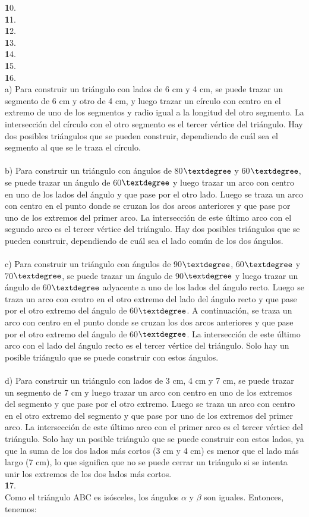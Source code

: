 \documentclass{article}
\begin{document}
{\textbf 10. }\\
{\textbf 11. }\\
{\textbf 12. }\\
{\textbf 13. }\\
{\textbf 14. }\\
{\textbf 15. }\\
{\textbf 16. }\\
a) Para construir un triángulo con lados de 6 cm y 4 cm, se puede trazar un segmento de 6 cm y otro de 4 cm, y luego trazar un círculo con centro en el extremo de uno de los segmentos y radio igual a la longitud del otro segmento. La intersección del círculo con el otro segmento es el tercer vértice del triángulo. Hay dos posibles triángulos que se pueden construir, dependiendo de cuál sea el segmento al que se le traza el círculo.\\
\\
b) Para construir un triángulo con ángulos de 80$\textdegree$ y 60$\textdegree$, se puede trazar un ángulo de 60$\textdegree$ y luego trazar un arco con centro en uno de los lados del ángulo y que pase por el otro lado. Luego se traza un arco con centro en el punto donde se cruzan los dos arcos anteriores y que pase por uno de los extremos del primer arco. La intersección de este último arco con el segundo arco es el tercer vértice del triángulo. Hay dos posibles triángulos que se pueden construir, dependiendo de cuál sea el lado común de los dos ángulos.\\
\\
c) Para construir un triángulo con ángulos de 90$\textdegree$, 60$\textdegree$ y 70$\textdegree$, se puede trazar un ángulo de 90$\textdegree$ y luego trazar un ángulo de 60$\textdegree$ adyacente a uno de los lados del ángulo recto. Luego se traza un arco con centro en el otro extremo del lado del ángulo recto y que pase por el otro extremo del ángulo de 60$\textdegree$. A continuación, se traza un arco con centro en el punto donde se cruzan los dos arcos anteriores y que pase por el otro extremo del ángulo de 60$\textdegree$. La intersección de este último arco con el lado del ángulo recto es el tercer vértice del triángulo. Solo hay un posible triángulo que se puede construir con estos ángulos.\\
\\
d) Para construir un triángulo con lados de 3 cm, 4 cm y 7 cm, se puede trazar un segmento de 7 cm y luego trazar un arco con centro en uno de los extremos del segmento y que pase por el otro extremo. Luego se traza un arco con centro en el otro extremo del segmento y que pase por uno de los extremos del primer arco. La intersección de este último arco con el primer arco es el tercer vértice del triángulo. Solo hay un posible triángulo que se puede construir con estos lados, ya que la suma de los dos lados más cortos (3 cm y 4 cm) es menor que el lado más largo (7 cm), lo que significa que no se puede cerrar un triángulo si se intenta unir los extremos de los dos lados más cortos.\\
{\textbf 17. }\\
Como el triángulo ABC es isósceles, los ángulos $\alpha$ y $\beta$ son iguales. Entonces, tenemos:\\
\\
\end{document}
